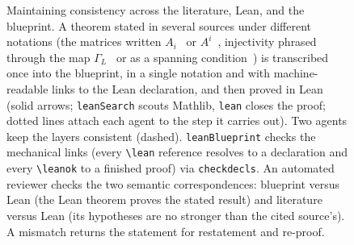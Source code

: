 \begin{figure}[t]
    \caption{%
        Maintaining consistency across the literature, Lean, and the blueprint.
        A theorem stated in several sources under
        different notations (the matrices written $A_i$~\cite{Perez-Garcia2007Matrix}
        or $A^{i}$~\cite{Cirac2017Matrixa,Cirac2021Matrix}, injectivity phrased
        through the map $\Gamma_L$~\cite{Perez-Garcia2007Matrix} or as a spanning
        condition~\cite{Cirac2017Matrixa}) is transcribed once into
        the blueprint, in a single notation and with machine-readable links to
        the Lean declaration, and then proved in Lean (solid arrows;
        \texttt{leanSearch} scouts Mathlib, \texttt{lean} closes the proof;
        dotted lines attach each agent to the step it carries out).
        Two agents keep the layers consistent (dashed). \texttt{leanBlueprint}
        checks the mechanical links (every \texttt{\textbackslash{}lean}
        reference resolves to a declaration and every
        \texttt{\textbackslash{}leanok} to a finished proof) via
        \texttt{checkdecls}. An automated reviewer checks the two semantic
        correspondences: blueprint versus Lean (the Lean theorem proves the
        stated result) and literature versus Lean (its hypotheses are no
        stronger than the cited source's). A mismatch returns the statement
        for restatement and re-proof.
    }\label{fig:alignment}
\end{figure}

